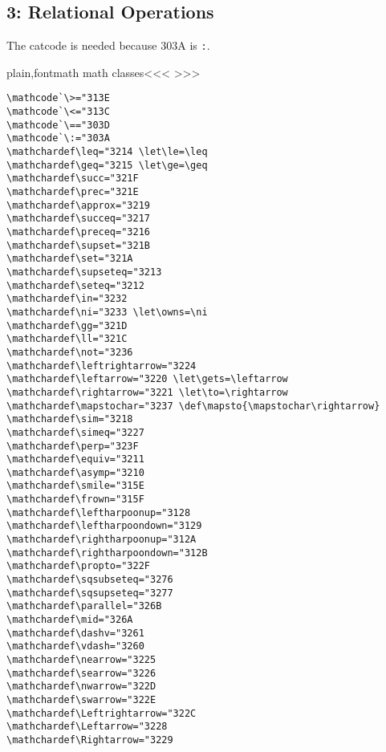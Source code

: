 {{\subsection{3: Relational Operations}

The catcode is needed because 303A is \verb':'.

\<plain,fontmath math classes\><<<
>>>




%

\begin{verbatim}
\mathcode`\>="313E
\mathcode`\<="313C
\mathcode`\=="303D
\mathcode`\:="303A
\mathchardef\leq="3214 \let\le=\leq
\mathchardef\geq="3215 \let\ge=\geq
\mathchardef\succ="321F
\mathchardef\prec="321E
\mathchardef\approx="3219
\mathchardef\succeq="3217
\mathchardef\preceq="3216
\mathchardef\supset="321B
\mathchardef\set="321A
\mathchardef\supseteq="3213
\mathchardef\seteq="3212
\mathchardef\in="3232
\mathchardef\ni="3233 \let\owns=\ni
\mathchardef\gg="321D
\mathchardef\ll="321C
\mathchardef\not="3236
\mathchardef\leftrightarrow="3224
\mathchardef\leftarrow="3220 \let\gets=\leftarrow
\mathchardef\rightarrow="3221 \let\to=\rightarrow
\mathchardef\mapstochar="3237 \def\mapsto{\mapstochar\rightarrow}
\mathchardef\sim="3218
\mathchardef\simeq="3227
\mathchardef\perp="323F
\mathchardef\equiv="3211
\mathchardef\asymp="3210
\mathchardef\smile="315E
\mathchardef\frown="315F
\mathchardef\leftharpoonup="3128
\mathchardef\leftharpoondown="3129
\mathchardef\rightharpoonup="312A
\mathchardef\rightharpoondown="312B
\mathchardef\propto="322F
\mathchardef\sqsubseteq="3276
\mathchardef\sqsupseteq="3277
\mathchardef\parallel="326B
\mathchardef\mid="326A
\mathchardef\dashv="3261
\mathchardef\vdash="3260
\mathchardef\nearrow="3225
\mathchardef\searrow="3226
\mathchardef\nwarrow="322D
\mathchardef\swarrow="322E
\mathchardef\Leftrightarrow="322C
\mathchardef\Leftarrow="3228
\mathchardef\Rightarrow="3229
\end{verbatim}


}}
